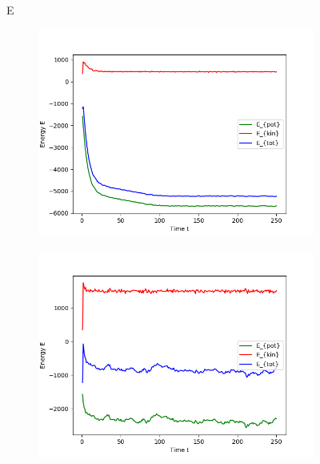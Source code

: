 \begin{figure}[ht]
\begin{subfigure}{0.3\textwidth}
\end{subfigure}

E
\hfill
\begin{subfigure}{0.3\textwidth}
\includegraphics[width=\textwidth]{../dat/Energies_T0d3.png}
\end{subfigure}
\hfill
\begin{subfigure}{0.3\textwidth}
\includegraphics[width=\textwidth]{../dat/Energies_T1d0.png}
\end{subfigure}
\hfill
\begin{subfigure}{0.3\textwidth}

\end{subfigure}
\end{figure}
